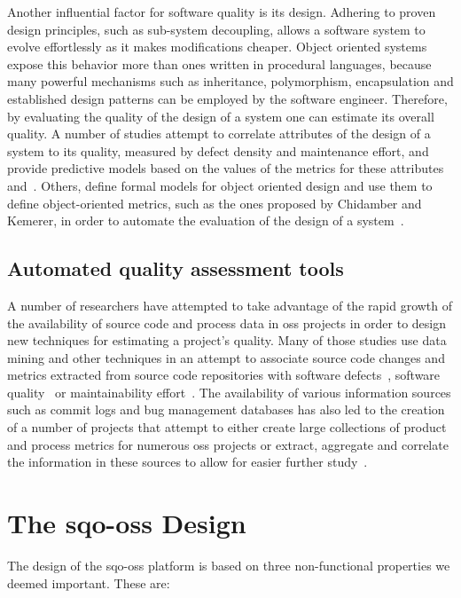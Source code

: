 \documentclass{llncs}
\begin{document}
Another influential factor for software quality is its design. Adhering to 
proven design principles, such as sub-system decoupling, allows a software 
system to evolve effortlessly as it makes modifications cheaper. Object oriented 
systems expose this behavior more than ones written in procedural languages, 
because many powerful mechanisms such as inheritance, polymorphism, encapsulation 
and established design patterns can be employed by the software engineer.
Therefore, by 
evaluating the quality of the design of a system one can estimate its overall 
quality.
A number of studies  attempt to correlate 
attributes of the design of a system to its quality, measured by defect density 
and maintenance effort, and provide predictive models based on the values of the
metrics for these attributes~\cite{ABES95} and~\cite{ABME96}. Others, define formal models for object oriented
design and use them to define object-oriented metrics, such as the ones
proposed by Chidamber and Kemerer, in order to automate the evaluation of the
design of a system~\cite{CHA03,REI01}. 

\subsection{Automated quality assessment tools} %

A number of researchers have attempted to take advantage of the rapid growth of 
the availability of source code and process data in {\sc oss} projects in 
order to design new techniques for estimating a project's quality. Many of 
those studies use data mining and other techniques in an attempt to associate 
source code changes and metrics extracted from source code repositories with 
software defects~\cite{WIHO05,PUPE05,LLMZ06}, software quality~\cite{SMRK07} or 
maintainability effort~\cite{ZWDZ05,TCS05}. The availability of various
information sources such as commit logs and bug management databases has also
led to the creation of a number of projects that attempt to either create large
collections of product and process metrics for numerous {\sc oss} projects
\cite{SKIB07,HCC06} or extract, aggregate and correlate the information in
these sources to allow for easier further study~\cite{CMSB05,HACK05,BWKG05}. 

\section{The {\sc sqo-oss} Design} %
\label{sec:sqo-oss-platform}
The design of the {\sc sqo-oss} platform is based on three non-functional properties 
we deemed important. These are:
\end{document}
